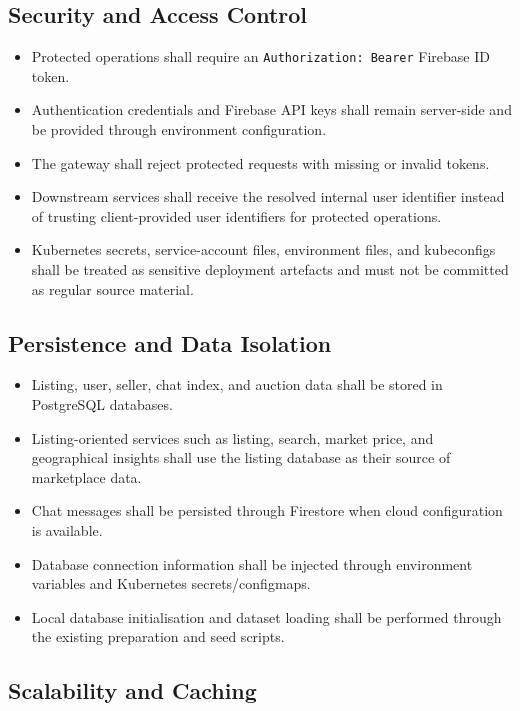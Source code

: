 \newpage 

\subsection{Security and Access Control}

\begin{itemize}
    \item Protected operations shall require an \texttt{Authorization: Bearer} Firebase ID token.
    \item Authentication credentials and Firebase API keys shall remain server-side and be provided through environment configuration.
    \item The gateway shall reject protected requests with missing or invalid tokens.
    \item Downstream services shall receive the resolved internal user identifier instead of trusting client-provided user identifiers for protected operations.
    \item Kubernetes secrets, service-account files, environment files, and kubeconfigs shall be treated as sensitive deployment artefacts and must not be committed as regular source material.
\end{itemize}

\subsection{Persistence and Data Isolation}

\begin{itemize}
    \item Listing, user, seller, chat index, and auction data shall be stored in PostgreSQL databases.
    \item Listing-oriented services such as listing, search, market price, and geographical insights shall use the listing database as their source of marketplace data.
    \item Chat messages shall be persisted through Firestore when cloud configuration is available.
    \item Database connection information shall be injected through environment variables and Kubernetes secrets/configmaps.
    \item Local database initialisation and dataset loading shall be performed through the existing preparation and seed scripts.
\end{itemize}

\subsection{Scalability and Caching}

